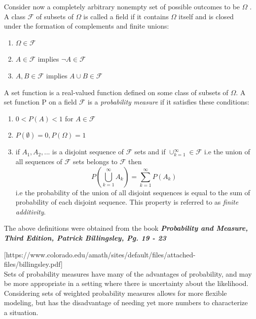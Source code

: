 \documentclass[UTF8]{article}
\newcommand{\mycite}[1]{\textbf{\textit{#1}}}
\begin{document}
Consider now a completely arbitrary nonempty set of possible outcomes to be $\Omega$ . A class $\mathcal{F}$ of
subsets of $\Omega$ is called a field if it contains $\Omega$ itself and is closed under the
formation of complements and finite unions: 
\begin{enumerate}[i]
    \item $ \Omega \in \mathcal{F}$
    \item $A \in \mathcal{F} $ implies $\neg A \in \mathcal{F}$ 
    \item $ A, B \in \mathcal{F}$ implies $A \cup B \in \mathcal{F}$
    
\end{enumerate}
A set function is a real-valued function defined on some class of subsets of
$ \Omega $. A set function P on a field  $ \mathcal{F}$ is a \textit{probability measure} if it satisfies these
conditions:
\begin{enumerate}[i]
    \item $ 0< P(A)< 1 $ for $ A \in \mathcal{F} $
    \item $ P(\emptyset) = 0, P(\Omega) = 1 $
    \item if $ A_1, A_2, ... $ is a disjoint sequence of $ \mathcal{F} $ sets and if $ \cup^\infty_{k=1} \in \mathcal{F}$ i.e the union of all sequences of $\mathcal{F} $ sets belongs to $\mathcal{F}$ then
    $$ P \left( \bigcup_{k = 1}^{\infty} A_k \right) = \sum_{k=1}^{\infty} P(A_k) $$ i.e the probability of the union of all disjoint sequences is equal to the sum of probability of each disjoint sequence. This property is referred to as \textit{finite additivity}.
\end{enumerate}
The above definitions were obtained from the book \mycite{Probability and Measure, Third Edition, Patrick Billingsley, Pg. 19 - 23}

[https://www.colorado.edu/amath/sites/default/files/attached-files/billingsley.pdf] \\

Sets of probability measures have many of the advantages of probability, and may be more appropriate in a setting where there is uncertainty about the likelihood.  Considering sets of weighted probability measures allows for more flexible modeling, but has the disadvantage of needing yet more numbers to characterize a situation.
\end{document}
